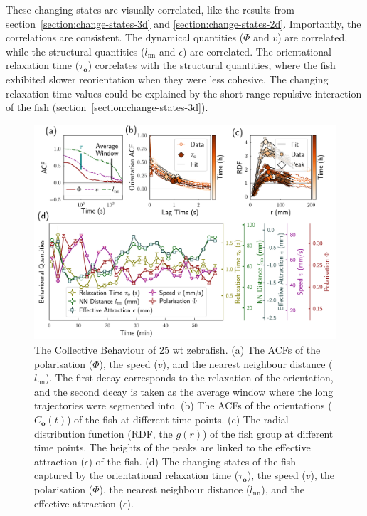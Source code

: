 \documentclass[11pt,twoside]{report}
\begin{document}
These changing states are visually correlated, like the results from section~\ref{section:change-states-3d} and \ref{section:change-states-2d}. Importantly, the correlations are consistent. The dynamical quantities ($\Phi$ and $v$) are correlated, while the structural quantities ($l_\mathrm{nn}$ and $\epsilon$) are correlated. The orientational relaxation time ($\tau_\mathbf{o}$) correlates with the structural quantities, where the fish exhibited slower reorientation when they were less cohesive. The changing relaxation time values could be explained by the short range repulsive interaction of the fish (section~\ref{section:change-states-3d}).

\begin{figure}
	\includegraphics[width=\linewidth]{states-wt}
	\caption[The changing states of 25 wt zebrafish]{
        The Collective Behaviour of 25 wt zebrafish.
        (a) The ACFs of the polarisation ($\Phi$), the speed ($v$), and the nearest neighbour distance ($l_\mathrm{nn}$). The first decay corresponds to the relaxation of the orientation, and the second decay is taken as the average window where the long  trajectories were segmented into.
        (b) The ACFs of the orientations ($C_\mathbf{o}(t)$) of the fish at different time points.
        (c) The radial distribution function (RDF, the $g(r)$) of the fish group at different time points. The heights of the peaks are linked to the effective attraction ($\epsilon$) of the fish.
        (d) The changing states of the fish captured by the orientational relaxation time ($\tau_\mathbf{o}$), the speed ($v$), the polarisation ($\Phi$), the nearest neighbour distance ($l_\mathrm{nn}$), and the effective attraction ($\epsilon$).
    }
\label{fig:states-wt}
\end{figure}
\end{document}
